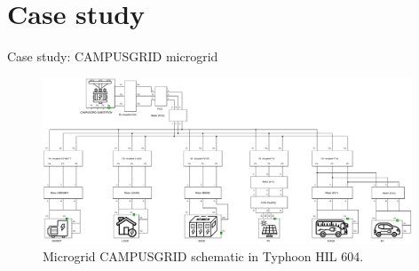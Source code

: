 \documentclass[10pt, aspectratio=1610]{beamer}
\begin{document}
\section{Case study}

\begin{frame}{Case study: CAMPUSGRID microgrid}
    \begin{figure}
        \includegraphics[width=0.98\textwidth]{../Figures/schematic_HIL.pdf}
        \caption{Microgrid CAMPUSGRID schematic in Typhoon HIL 604.}
    \end{figure}
\end{frame}

                
\end{document}
